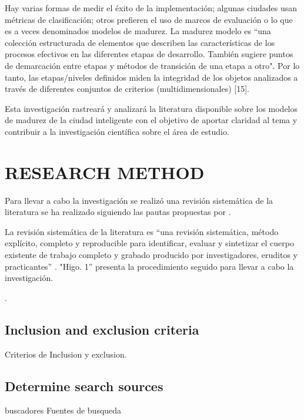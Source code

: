 \documentclass[a4paper,fleqn,spanish]{cas-dc}
\begin{document}
Hay varias formas de medir el éxito de la implementación; algunas ciudades usan
métricas de clasificación; otros prefieren el uso de marcos de evaluación o lo
que es a veces denominados modelos de madurez. La madurez modelo es “una
colección estructurada de elementos que describen las características de los
procesos efectivos en las diferentes etapas de desarrollo. También sugiere
puntos de demarcación entre etapas y métodos de transición de una etapa a
otro". Por lo tanto, las etapas/niveles definidos miden la integridad de los
objetos analizados a través de diferentes conjuntos de criterios
(multidimensionales) [15].

Esta investigación rastreará y analizará la literatura
disponible sobre los modelos de madurez de la ciudad inteligente con el
objetivo de aportar claridad al tema y contribuir a la
investigación científica sobre el área de estudio.
\cite{aljowder_systematic_2019}


\section{RESEARCH METHOD}\label{metodo}

Para llevar a cabo la investigación se realizó una revisión sistemática de la
literatura se ha realizado siguiendo las pautas propuestas por 
\cite{Wolfswinkel2017}.

La revisión sistemática de la literatura es “una revisión sistemática, método
explícito, completo y reproducible para identificar, evaluar y sintetizar el
cuerpo existente de trabajo completo y grabado producido por investigadores,
eruditos y practicantes” \cite{Okoli2015}. "Higo. 1” presenta la procedimiento
seguido para llevar a cabo la investigación.

\cite{kitchenham_guidelines_2007, webster_analyzing_2002}.

\subsection{Inclusion and exclusion criteria}\label{criterio}

Criterios de Inclusion y exclusion.

\subsection{Determine search sources}\label{fuentes}

buscadores
Fuentes de busqueda
\end{document}
